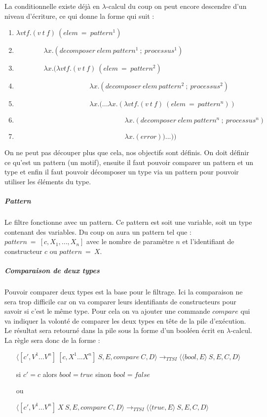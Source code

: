 \documentclass[10pt,a4paper]{report}
\begin{document}
	
	La conditionnelle existe déjà en $\lambda$-calcul du coup on peut encore descendre d'un niveau d'écriture, ce qui donne la forme qui suit :
	\begin{enumerate}
		\item $\lambda vtf.(v~t~f)~(elem~=~pattern^{1})$
		\item $~~~~~~~~~~~~~~~~~~ \lambda x.(decomposer~elem~pattern^{1}~;~processus^{1})$
		\item $~~~~~~~~~~~~~~~~~~ \lambda x.(\lambda vtf.(v~t~f)~(elem~=~pattern^{2})$
		\item $~~~~~~~~~~~~~~~~~~~~~~~~~~~~~~~~~~~~~~~~~~~~~~~~ \lambda x.(decomposer~elem~pattern^{2}~;~processus^{2})$
		\item $~~~~~~~~~~~~~~~~~~~~~~~~~~~~~~~~~~~~~~~~~~~~~~~~ \lambda x.(...\lambda x.(\lambda vtf.(v~t~f)~(elem~=~pattern^{n}))$
		\item $~~~~~~~~~~~~~~~~~~~~~~~~~~~~~~~~~~~~~~~~~~~~~~~~~~~~~~~~~~~~~~~~~~~~~~~ \lambda x.(decomposer~elem~pattern^{n}~;~processus^{n})$
		\item $~~~~~~~~~~~~~~~~~~~~~~~~~~~~~~~~~~~~~~~~~~~~~~~~~~~~~~~~~~~~~~~~~~~~~~~\lambda x.(error))...))$
	\end{enumerate}
	\bigbreak
	
	
	On ne peut pas découper plus que cela, nos objectifs sont définis. On doit définir ce qu'est un pattern (un motif), ensuite il faut pouvoir comparer un pattern et un type et enfin il faut pouvoir décomposer un type via un pattern pour pouvoir utiliser les éléments du type.
	
	
	\subparagraph{Pattern } Le filtre fonctionne avec un pattern. Ce pattern est soit une variable, soit un type contenant des variables. Du coup on aura un pattern tel que : $pattern~=~[c,X_{1},...,X_{n}]$ avec le nombre de paramètre $n$ et l'identifiant de constructeur $c$ ou $pattern~=~X$.
	
	\subparagraph{Comparaison de deux types } Pouvoir comparer deux types est la base pour le filtrage. Ici la comparaison ne sera trop difficile car on va comparer leurs identifiants de constructeurs pour savoir si c'est le même type. Pour cela on va ajouter une commande $compare$ qui va indiquer la volonté de comparer les deux types en tête de la pile d'exécution. Le résultat sera retourné dans la pile sous la forme d'un booléen écrit en $\lambda$-calcul. La règle sera donc de la forme :
	\smallbreak
	\begin{enumerate}
		\item[] $\langle [c',V^{1}...V^{n}]~[c,X^{1}...X^{n}]~S,E,compare~C,D\rangle
		\longrightarrow_{TTSI} 
		\langle \langle bool,E\rangle~S,E,C,D\rangle$ 
		\item[] si $c'=c$ alors $bool = true$ sinon $bool = false$ 
		\item[ou]
		\item[] $\langle [c',V^{1}...V^{n}]~X~S,E,compare~C,D\rangle
		\longrightarrow_{TTSI} 
		\langle \langle true,E\rangle~S,E,C,D\rangle$ 
	\end{enumerate}
\end{document}
